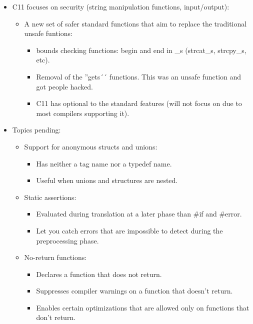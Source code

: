 \begin{itemize}
    \item C11 focuses on security (string manipulation functions, input/output):
        \begin{itemize}
            \item A new set of safer standard functions that aim to replace the traditional unsafe funtions:
                \begin{itemize}
                    \item bounds checking functions: begin and end in \_s (strcat\_s, strcpy\_s, etc).
                    \item Removal of the ''gets´´ functions. This was an unsafe function and got people hacked.
                    \item C11 has optional to the standard features (will not focus on due to most compilers supporting it).
                \end{itemize}
        \end{itemize}
    
    \item Topics pending:
        \begin{itemize}
            \item Support for anonymous structs and unions:
                \begin{itemize}
                    \item Has neither a tag name nor a typedef name.
                    \item Useful when unions and structures are nested.
                \end{itemize}
            
            \item Static assertions:
                \begin{itemize}
                    \item Evaluated during translation at a later phase than \#if and \#error.
                    \item Let you catch errors that are impossible to detect during the preprocessing phase.
                \end{itemize}
            
            \item No-return functions:
                \begin{itemize}
                    \item Declares a function that does not return.
                    \item Suppresses compiler warnings on a function that doesn't return.
                    \item Enables certain optimizations that are allowed only on functions that don't return.
                \end{itemize}
            

\end{itemize}
\end{itemize}
